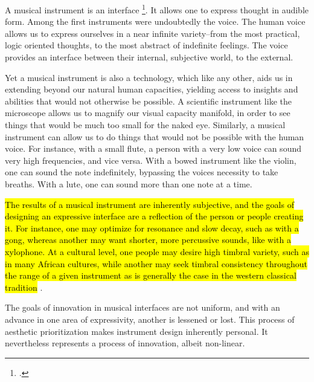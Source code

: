 \documentclass[12pt,twoside,maitrise]{dms_ks}
\theoremstyle{definition}
\begin{document}
{A musical instrument is an interface \footcite{noauthor_instrument_nodate}. 
It allows one to express thought in audible form. 
Among the first instruments were undoubtedly the voice. 
The human voice allows us to express ourselves in a near infinite variety--from the most practical, logic oriented thoughts, to the most abstract of indefinite feelings. 
The voice provides an interface between their internal, subjective world, to the external. 

Yet a musical instrument is also a technology, which like any other, aids us in extending beyond our natural human capacities, yielding access to insights and abilities that would not otherwise be possible. 
A scientific instrument like the microscope allows us to magnify our visual capacity manifold, in order to see things that would be much too small for the naked eye. 
Similarly, a musical instrument can allow us to do things that would not be possible with the human voice. 
For instance, with a small flute, a person with a very low voice can sound very high frequencies, and vice versa. 
With a bowed instrument like the violin, one can sound the note indefinitely, bypassing the voices necessity to take breaths. 
With a lute, one can sound more than one note at a time. 

\hl{The results of a musical instrument are inherently subjective, and the goals of designing an expressive interface are a reflection of the person or people creating it. 
For instance, one may optimize for resonance and slow decay, such as with a gong, whereas another may want shorter, more percussive sounds, like with a xylophone. 
At a cultural level, one people may desire high timbral variety, such as in many African cultures, while another may seek timbral consistency throughout the range of a given instrument as is generally the case in the western classical tradition} . 


The goals of innovation in musical interfaces are not uniform, and with an advance in one area of expressivity, another is lessened or lost. 
This process of aesthetic prioritization makes instrument design inherently personal. It nevertheless represents a process of innovation, albeit non-linear. 

}
\end{document}
